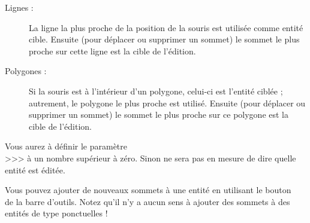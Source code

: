 \begin{description}
\item[Lignes :] La ligne la plus proche de la position de la souris est utilisée comme entité cible. Ensuite (pour déplacer ou supprimer un sommet) le sommet le plus proche sur cette ligne est la cible de l'édition.
\item[Polygones :] Si la souris est à l'intérieur d'un polygone, celui-ci est l'entité ciblée ; autrement, le polygone le plus proche est utilisé. Ensuite (pour déplacer ou supprimer un sommet) le sommet le plus proche sur ce polygone est la cible de l'édition.
\end{description}

Vous aurez à définir le paramètre\\ >>> à un nombre supérieur à zéro. Sinon \qg ne sera pas en mesure de dire quelle entité est éditée.

Vous pouvez ajouter de nouveaux sommets à une entité en utilisant le bouton\\  de la barre d'outils. Notez qu'il n'y a aucun sens à ajouter des sommets à des entités de type ponctuelles !


